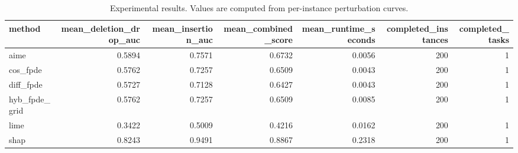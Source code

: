 \begin{table}[t]
\caption{Experimental results. Values are computed from per-instance perturbation curves.}
\label{tab:main_results_computed}
\centering
\begin{tabular}{lrrrrrr}
\toprule
method & mean\_deletion\_drop\_auc & mean\_insertion\_auc & mean\_combined\_score & mean\_runtime\_seconds & completed\_instances & completed\_tasks \\
\midrule
aime & 0.5894 & 0.7571 & 0.6732 & 0.0056 & 200 & 1 \\
cos\_fpde & 0.5762 & 0.7257 & 0.6509 & 0.0043 & 200 & 1 \\
diff\_fpde & 0.5727 & 0.7128 & 0.6427 & 0.0043 & 200 & 1 \\
hyb\_fpde\_grid & 0.5762 & 0.7257 & 0.6509 & 0.0085 & 200 & 1 \\
lime & 0.3422 & 0.5009 & 0.4216 & 0.0162 & 200 & 1 \\
shap & 0.8243 & 0.9491 & 0.8867 & 0.2318 & 200 & 1 \\
\bottomrule
\end{tabular}

\end{table}

